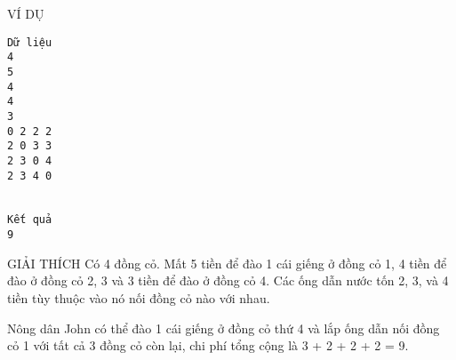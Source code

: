 VÍ DỤ
\begin{verbatim}
Dữ liệu
4
5
4
4
3
0 2 2 2
2 0 3 3
2 3 0 4
2 3 4 0


Kết quả
9
\end{verbatim}
GIẢI THÍCH
Có 4 đồng cỏ. Mất 5 tiền để đào 1 cái giếng ở đồng cỏ 1, 4 tiền để đào ở đồng cỏ 2, 3 và 3 tiền để đào ở đồng cỏ 4. Các ống dẫn nước tốn 2, 3, và 4 tiền tùy thuộc vào nó nối đồng cỏ nào với nhau.  

   Nông dân John có thể đào 1 cái giếng ở đồng cỏ thứ 4 và lắp ống dẫn  nối đồng cỏ 1 với tất cả 3 đồng cỏ còn lại, chi phí tổng cộng là 3 + 2 + 2 + 2 = 9.